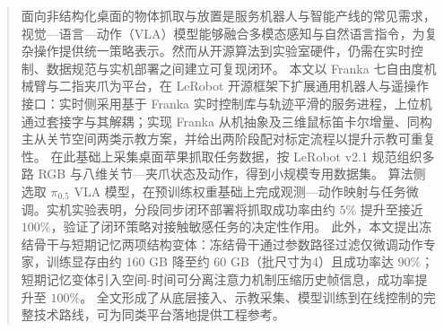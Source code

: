 
\begin{abstract}
    面向非结构化桌面的物体抓取与放置是服务机器人与智能产线的常见需求，视觉—语言—动作（VLA）模型能够融合多模态感知与自然语言指令，为复杂操作提供统一策略表示。然而从开源算法到实验室硬件，仍需在实时控制、数据规范与实机部署之间建立可复现闭环。
    本文以 Franka 七自由度机械臂与二指夹爪为平台，在 LeRobot 开源框架下扩展通用机器人与遥操作接口：实时侧采用基于 Franka 实时控制库与轨迹平滑的服务进程，上位机通过套接字与其解耦；实现 Franka 从机抽象及三维鼠标笛卡尔增量、同构主从关节空间两类示教方案，并给出两阶段配对标定流程以提升示教可重复性。
    在此基础上采集桌面苹果抓取任务数据，按 LeRobot v2.1 规范组织多路 RGB 与八维关节—夹爪状态及动作，得到小规模专用数据集。
    算法侧选取 $\pi_{0.5}$ VLA 模型，在预训练权重基础上完成观测—动作映射与任务微调。实机实验表明，分段同步闭环部署将抓取成功率由约 $5\%$ 提升至接近 $100\%$，验证了闭环策略对接触敏感任务的决定性作用。
    此外，本文提出冻结骨干与短期记忆两项结构变体：冻结骨干通过参数路径过滤仅微调动作专家，训练显存由约 160 GB 降至约 60 GB（批尺寸为4）且成功率达 $90\%$；短期记忆变体引入空间-时间可分离注意力机制压缩历史帧信息，成功率提升至 $100\%$。
    全文形成了从底层接入、示教采集、模型训练到在线控制的完整技术路线，可为同类平台落地提供工程参考。
\end{abstract}
    
    
